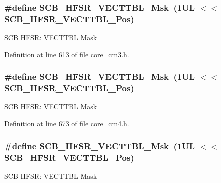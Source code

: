\subsubsection[{\texorpdfstring{S\+C\+B\+\_\+\+H\+F\+S\+R\+\_\+\+V\+E\+C\+T\+T\+B\+L\+\_\+\+Msk}{SCB_HFSR_VECTTBL_Msk}}]{\setlength{\rightskip}{0pt plus 5cm}\#define S\+C\+B\+\_\+\+H\+F\+S\+R\+\_\+\+V\+E\+C\+T\+T\+B\+L\+\_\+\+Msk~(1\+U\+L $<$$<$ S\+C\+B\+\_\+\+H\+F\+S\+R\+\_\+\+V\+E\+C\+T\+T\+B\+L\+\_\+\+Pos)}\hypertarget{group___c_m_s_i_s___s_c_b_gaac5e289211d0a63fe879a9691cb9e1a9}{}\label{group___c_m_s_i_s___s_c_b_gaac5e289211d0a63fe879a9691cb9e1a9}
S\+CB H\+F\+SR\+: V\+E\+C\+T\+T\+BL Mask 

Definition at line 613 of file core\+\_\+cm3.\+h.

\subsubsection[{\texorpdfstring{S\+C\+B\+\_\+\+H\+F\+S\+R\+\_\+\+V\+E\+C\+T\+T\+B\+L\+\_\+\+Msk}{SCB_HFSR_VECTTBL_Msk}}]{\setlength{\rightskip}{0pt plus 5cm}\#define S\+C\+B\+\_\+\+H\+F\+S\+R\+\_\+\+V\+E\+C\+T\+T\+B\+L\+\_\+\+Msk~(1\+U\+L $<$$<$ S\+C\+B\+\_\+\+H\+F\+S\+R\+\_\+\+V\+E\+C\+T\+T\+B\+L\+\_\+\+Pos)}\hypertarget{group___c_m_s_i_s___s_c_b_gaac5e289211d0a63fe879a9691cb9e1a9}{}\label{group___c_m_s_i_s___s_c_b_gaac5e289211d0a63fe879a9691cb9e1a9}
S\+CB H\+F\+SR\+: V\+E\+C\+T\+T\+BL Mask 

Definition at line 673 of file core\+\_\+cm4.\+h.

\subsubsection[{\texorpdfstring{S\+C\+B\+\_\+\+H\+F\+S\+R\+\_\+\+V\+E\+C\+T\+T\+B\+L\+\_\+\+Msk}{SCB_HFSR_VECTTBL_Msk}}]{\setlength{\rightskip}{0pt plus 5cm}\#define S\+C\+B\+\_\+\+H\+F\+S\+R\+\_\+\+V\+E\+C\+T\+T\+B\+L\+\_\+\+Msk~(1\+U\+L $<$$<$ S\+C\+B\+\_\+\+H\+F\+S\+R\+\_\+\+V\+E\+C\+T\+T\+B\+L\+\_\+\+Pos)}\hypertarget{group___c_m_s_i_s___s_c_b_gaac5e289211d0a63fe879a9691cb9e1a9}{}\label{group___c_m_s_i_s___s_c_b_gaac5e289211d0a63fe879a9691cb9e1a9}
S\+CB H\+F\+SR\+: V\+E\+C\+T\+T\+BL Mask 

